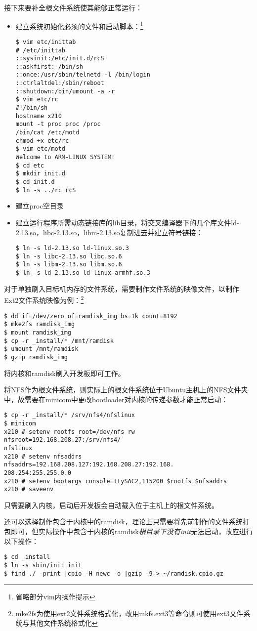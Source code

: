 \documentclass[hyperref,UTF8]{ctexart}
\begin{document}
接下来要补全根文件系统使其能够正常运行：
\begin{itemize}
    \item
{
    建立系统初始化必须的文件和启动脚本：\footnote{省略部分vim内操作提示}
\begin{Verbatim}[frame=single]
$ vim etc/inittab
# /etc/inittab
::sysinit:/etc/init.d/rcS
::askfirst:-/bin/sh
::once:/usr/sbin/telnetd -l /bin/login
::ctrlaltdel:/sbin/reboot
::shutdown:/bin/umount -a -r
$ vim etc/rc
#!/bin/sh
hostname x210
mount -t proc proc /proc
/bin/cat /etc/motd
chmod +x etc/rc
$ vim etc/motd
Welcome to ARM-LINUX SYSTEM!
$ cd etc
$ mkdir init.d
$ cd init.d
$ ln -s ../rc rcS
\end{Verbatim}
}
    \item 建立proc空目录
    \item 建立运行程序所需动态链接库的lib目录，将交叉编译器下的几个库文件ld-2.13.so，libc-2.13.so，libm-2.13.so复制进去并建立符号链接：
\begin{Verbatim}[frame=single]
$ ln -s ld-2.13.so ld-linux.so.3
$ ln -s libc-2.13.so libc.so.6
$ ln -s libm-2.13.so libm.so.6
$ ln -s ld-2.13.so ld-linux-armhf.so.3
\end{Verbatim}
\end{itemize}

对于单独刷入目标机内存的文件系统，需要制作文件系统的映像文件，以制作Ext2文件系统映像为例：\footnote{mke2fs为使用ext2文件系统格式化，改用mkfs.ext3等命令则可使用ext3文件系统与其他文件系统格式化}
\begin{Verbatim}[frame=single]
$ dd if=/dev/zero of=ramdisk_img bs=1k count=8192
$ mke2fs ramdisk_img
$ mount ramdisk_img
$ cp -r _install/* /mnt/ramdisk
$ umount /mnt/ramdisk
$ gzip ramdisk_img
\end{Verbatim}
将内核和ramdisk刷入开发板即可工作。

将NFS作为根文件系统，则实际上的根文件系统位于Ubuntu主机上的NFS文件夹中，故需要在minicom中更改bootloader对内核的传递参数才能正常启动：
\begin{Verbatim}[frame=single]
$ cp -r _install/* /srv/nfs4/nfslinux
$ minicom
x210 # setenv rootfs root=/dev/nfs rw nfsroot=192.168.208.27:/srv/nfs4/
nfslinux
x210 # setenv nfsaddrs nfsaddrs=192.168.208.127:192.168.208.27:192.168.
208.254:255.255.0.0
x210 # setenv bootargs console=ttySAC2,115200 $rootfs $nfsaddrs
x210 # saveenv
\end{Verbatim}
只需要刷入内核，启动后开发板会自动载入位于主机上的根文件系统。

还可以选择制作包含于内核中的ramdisk，理论上只需要将先前制作的文件系统打包即可，但实际操作中包含于内核的ramdisk\emph{根目录下没有init}无法启动，故应进行以下操作：
\begin{Verbatim}[frame=single]
$ cd _install
$ ln -s sbin/init init
$ find ./ -print |cpio -H newc -o |gzip -9 > ~/ramdisk.cpio.gz
\end{Verbatim}
\end{document}
